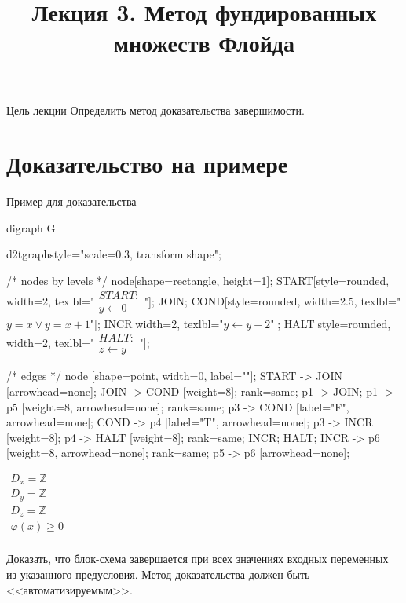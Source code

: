 \documentclass[hyperref={unicode=true}]{beamer}
\title{Лекция 3. Метод фундированных множеств Флойда}
\author{}
\date{}
\begin{document}
	\begin{frame}{}
		\titlepage
	\end{frame}

    \begin{frame}{Цель лекции}
    Определить метод доказательства завершимости.
    \end{frame}

    \section{Доказательство на примере}

	\begin{frame}[fragile]{Пример для доказательства}
	\begin{multicols}{2}

	\huge
	\begin{dot2tex}[options=-traw]
	digraph G{
		d2tgraphstyle="scale=0.3, transform shape";

		/* nodes by levels */
		node[shape=rectangle, height=1];
		START[style=rounded, width=2, texlbl="$\begin{matrix}START:\\ y \leftarrow 0\end{matrix}$"];
		JOIN;
        COND[style=rounded, width=2.5, texlbl="$y = x \lor y = x + 1$"];
		INCR[width=2, texlbl="$y \leftarrow y + 2$"];
        HALT[style=rounded, width=2, texlbl="$\begin{matrix}HALT:\\  z \leftarrow y\end{matrix}$"];

		/* edges */
		node [shape=point, width=0, label=""];
		START -> JOIN [arrowhead=none]; JOIN -> COND [weight=8];
		{ rank=same; p1 -> JOIN; }
		p1 -> p5 [weight=8, arrowhead=none];
		{ rank=same; p3 -> COND [label="F", arrowhead=none]; COND -> p4 [label="T", arrowhead=none]; }
		p3 -> INCR [weight=8];
		p4 -> HALT [weight=8];
		{ rank=same; INCR; HALT; }
		INCR -> p6 [weight=8, arrowhead=none];
		{ rank=same; p5 -> p6 [arrowhead=none]; }
        }
	\end{dot2tex}

	\normalsize

    $\begin{matrix}
    D_x = \mathbb{Z}\\
    D_y = \mathbb{Z}\\
    D_z = \mathbb{Z}\\
    \varphi(x) \geq 0\\
    \end{matrix}$

	\end{multicols}

    Доказать, что блок-схема завершается при всех значениях входных переменных из указанного предусловия. Метод доказательства должен быть <<автоматизируемым>>.
	\end{frame}
\end{document}
